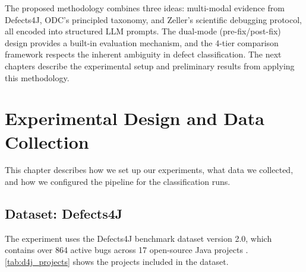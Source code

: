 \documentclass{iutbscthesis}
\begin{document}
The proposed methodology combines three ideas: multi-modal evidence from Defects4J, ODC's principled taxonomy, and Zeller's scientific debugging protocol, all encoded into structured LLM prompts. The dual-mode (pre-fix/post-fix) design provides a built-in evaluation mechanism, and the 4-tier comparison framework respects the inherent ambiguity in defect classification. The next chapters describe the experimental setup and preliminary results from applying this methodology.


\chapter{Experimental Design and Data Collection}

This chapter describes how we set up our experiments, what data we collected, and how we configured the pipeline for the classification runs.

\section{Dataset: Defects4J}

The experiment uses the Defects4J benchmark dataset version 2.0, which contains over 864 active bugs across 17 open-source Java projects \cite{just2014defects4j}. \autoref{tab:d4j_projects} shows the projects included in the dataset.
\end{document}
